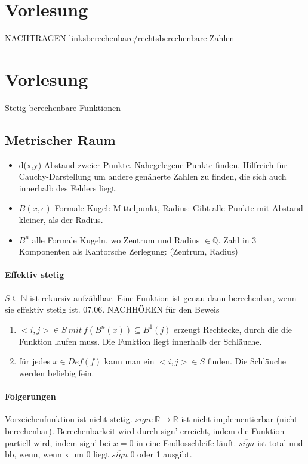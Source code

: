 \documentclass[ngerman]{scrartcl}
\begin{document}
\section{Vorlesung}
NACHTRAGEN
linksberechenbare/rechtsberechenbare Zahlen

\section{Vorlesung}
Stetig berechenbare Funktionen
\subsection{Metrischer Raum}
\begin{itemize}
  \item d(x,y) Abstand zweier Punkte. Nahegelegene Punkte finden. Hilfreich für Cauchy-Darstellung um andere genäherte Zahlen zu finden, die sich auch innerhalb des Fehlers liegt.
  \item $ B(x,\epsilon) $ Formale Kugel: Mittelpunkt, Radius: Gibt alle Punkte mit Abstand kleiner, als der Radius. 
  \item $ B^n $ alle Formale Kugeln, wo Zentrum und Radius $ \in\mathbb{Q} $. Zahl in 3 Komponenten als Kantorsche Zerlegung: (Zentrum, Radius)
\end{itemize}

\paragraph{Effektiv stetig} 
$ S \subseteq \mathbb{N} $ ist rekursiv aufzählbar. Eine Funktion ist genau dann berechenbar, wenn sie effektiv stetig ist. 07.06. NACHHÖREN für den Beweis
\begin{enumerate}
  \item $ <i,j> \in S\ mit\ f(B^n(x))\subseteq B^1(j) $ erzeugt Rechtecke, durch die die Funktion laufen muss. Die Funktion liegt innerhalb der Schläuche.
  \item für jedes $ x\in Def(f) $ kann man ein $ <i,j> \in S $ finden. Die Schläuche werden beliebig fein.
\end{enumerate}

\paragraph{Folgerungen} Vorzeichenfunktion ist nicht stetig. $ sign: \mathbb{R} \rightarrow \mathbb{R}  $ ist nicht implementierbar (nicht berechenbar). Berechenbarkeit wird durch sign' erreicht, indem die Funktion partiell wird, indem sign' bei $ x=0 $ in eine Endlosschleife läuft. $ \overline{sign} $ ist total und bb, wenn, wenn x um 0 liegt $ \overline{sign} $ 0 oder 1 ausgibt.  
\end{document}
